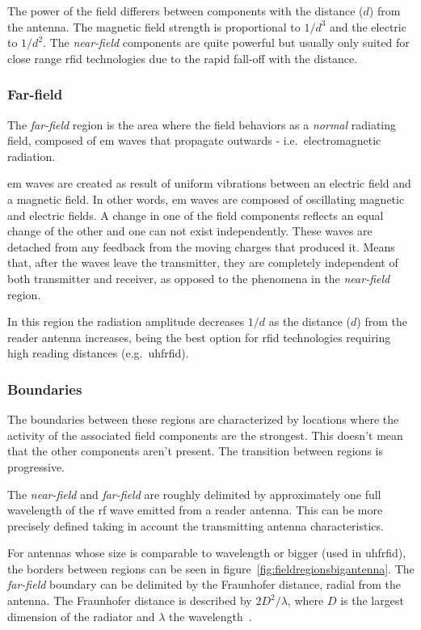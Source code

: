 The power of the field differers between components with the distance ($d$) from the antenna. The magnetic field strength is proportional to $1/d^3$ and the electric to $1/d^2$. The \emph{near-field} components are quite powerful but usually only suited for close range \ac{rfid} technologies due to the rapid fall-off with the distance.

\subsubsection{Far-field}

The \emph{far-field} region is the area where the field behaviors as a \textit{normal} radiating field, composed of \ac{em} waves that propagate outwards - i.e.\ electromagnetic radiation.

\ac{em} waves are created as result of uniform vibrations between an electric field and a magnetic field. In other words, \ac{em} waves are composed of oscillating magnetic and electric fields. A change in one of the field components reflects an equal change of the other and one can not exist independently.
These waves are detached from any feedback from the moving charges that produced it. Means that, after the waves leave the transmitter, they are completely independent of both transmitter and receiver, as opposed to the phenomena in the \emph{near-field} region.

In this region the radiation amplitude decreases $1/d$ as the distance ($d$) from the reader antenna increases, being the best option for \ac{rfid} technologies requiring high reading distances (e.g.\ \ac{uhfrfid}).

\subsubsection{Boundaries}

The boundaries between these regions are characterized by locations where the activity of the associated field components are the strongest. This doesn't mean that the other components aren't present. The transition between regions is progressive.

The \emph{near-field} and \emph{far-field} are roughly delimited by approximately one full wavelength of the \ac{rf} wave emitted from a reader antenna.
This can be more precisely defined taking in account the transmitting antenna characteristics.

For antennas whose size is comparable to wavelength or bigger (used in \ac{uhfrfid}), the borders between regions can be seen in figure~\ref{fig:fieldregionsbigantenna}. The \emph{far-field} boundary can be delimited by the Fraunhofer distance, radial from the antenna. The Fraunhofer distance is described by $2D^2 / \lambda$, where $D$ is the largest dimension of the radiator and $\lambda$ the wavelength~\cite{balanisAntennaTheoryAnalysis2005}.

